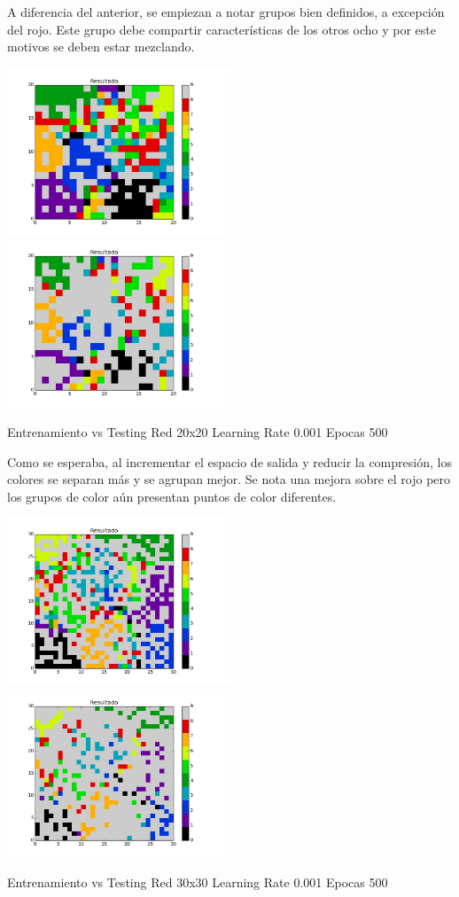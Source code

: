 A diferencia del anterior, se empiezan a notar grupos bien definidos, a excepci\'on del rojo. Este grupo debe compartir caracter\'isticas de los otros ocho y por este motivos se deben estar mezclando. 

\includegraphics[width=0.5\textwidth]{img/ej2_train_M_20_lrate_001_epocas_500}
\includegraphics[width=0.5\textwidth]{img/ej2_test_M_20_lrate_001_epocas_500}
{\center \footnotesize Entrenamiento vs Testing Red 20x20 Learning Rate 0.001 Epocas 500\par}

Como se esperaba, al incrementar el espacio de salida y reducir la compresi\'on, los colores se separan m\'as y se agrupan mejor. Se nota una mejora sobre el rojo pero los grupos de color a\'un presentan puntos de color diferentes.

\includegraphics[width=0.5\textwidth]{img/ej2_train_M_30_lrate_001_epocas_500}
\includegraphics[width=0.5\textwidth]{img/ej2_test_M_30_lrate_001_epocas_500}
{\footnotesize Entrenamiento vs Testing Red 30x30 Learning Rate 0.001 Epocas 500\par}

